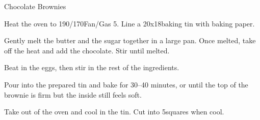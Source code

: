\begin{recipe}[\vegetarian]{Chocolate Brownies}

    \begin{ingredients}
    \end{ingredients}

    \begin{instructions}
        Heat the oven to 190\degC/170\degC Fan/Gas 5. Line a 20x18\cm baking tin with baking paper.

        Gently melt the butter and the sugar together in a large pan. Once melted, take off the heat and add the chocolate. Stir until melted.

        Beat in the eggs, then stir in the rest of the ingredients.

        Pour into the prepared tin and bake for 30–40 minutes, or until the top of the brownie is firm but the inside still feels soft.

        Take out of the oven and cool in the tin. Cut into 5\cm squares when cool.
    \end{instructions}
\end{recipe}
